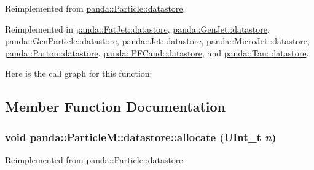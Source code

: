 Reimplemented from \hyperlink{structpanda_1_1Particle_1_1datastore_afb2d9f4926afbfa8e0f15f0d8d98094a}{panda::Particle::datastore}.

Reimplemented in \hyperlink{structpanda_1_1FatJet_1_1datastore_ab30c9e78310606976935325a55cb10e6}{panda::FatJet::datastore}, \hyperlink{structpanda_1_1GenJet_1_1datastore_aee5add4c9f162350865cec47c322dec0}{panda::GenJet::datastore}, \hyperlink{structpanda_1_1GenParticle_1_1datastore_af04b1b2c05d433c8020d5250db10d7d9}{panda::GenParticle::datastore}, \hyperlink{structpanda_1_1Jet_1_1datastore_a70fb643b535f39f676287fe34d603e01}{panda::Jet::datastore}, \hyperlink{structpanda_1_1MicroJet_1_1datastore_a35979d6037e5229b018a32e3d0700360}{panda::MicroJet::datastore}, \hyperlink{structpanda_1_1Parton_1_1datastore_aa1e55feb33f97040c324d9ba93126dba}{panda::Parton::datastore}, \hyperlink{structpanda_1_1PFCand_1_1datastore_af62f03093f0dd1177468df953265e198}{panda::PFCand::datastore}, and \hyperlink{structpanda_1_1Tau_1_1datastore_a1cacb9f88f221d242a5e80ba7959c27b}{panda::Tau::datastore}.

Here is the call graph for this function:

\subsection{Member Function Documentation}
\hypertarget{structpanda_1_1ParticleM_1_1datastore_aafc17a88cf8425ff45a00b5fd2eb5751}{
\subsubsection[{allocate}]{\setlength{\rightskip}{0pt plus 5cm}void panda::ParticleM::datastore::allocate (UInt\_\-t {\em n})}}
\label{structpanda_1_1ParticleM_1_1datastore_aafc17a88cf8425ff45a00b5fd2eb5751}


Reimplemented from \hyperlink{structpanda_1_1Particle_1_1datastore_aab4009a97b5f3cc30eaf61cd7dbf2e3d}{panda::Particle::datastore}.

